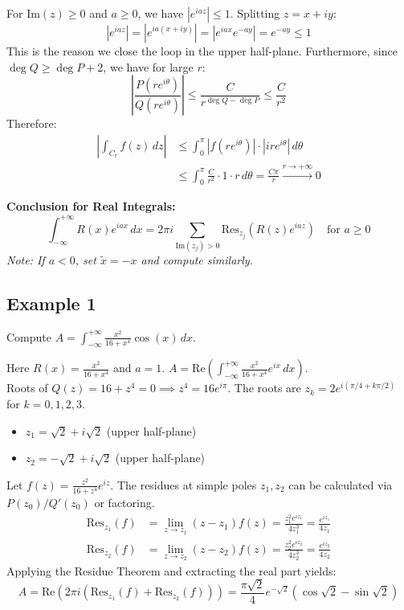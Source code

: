 \begin{proofbox}
For $\text{Im}(z) \ge 0$ and $a \ge 0$, we have $|e^{iaz}| \le 1$. Splitting $z = x + iy$:
\begin{equation*}
|e^{iaz}| = |e^{ia(x+iy)}| = |e^{iax} e^{-ay}| = e^{-ay} \le 1
\end{equation*}
This is the reason we close the loop in the upper half-plane. Furthermore, since $\deg Q \ge \deg P + 2$, we have for large $r$:
\begin{equation*}
\left| \frac{P(re^{i\theta})}{Q(re^{i\theta})} \right| \le \frac{C}{r^{\deg Q - \deg P}} \le \frac{C}{r^2}
\end{equation*}
Therefore:
\begin{align*}
\left| \int_{C_r} f(z) \, dz \right| &\le \int_0^\pi \left| f(re^{i\theta}) \right| \cdot \left| i r e^{i\theta} \right| \, d\theta \\
&\le \int_0^\pi \frac{C}{r^2} \cdot 1 \cdot r \, d\theta = \frac{C\pi}{r} \xrightarrow{r \to +\infty} 0
\end{align*}
\end{proofbox}

\noindent \textbf{Conclusion for Real Integrals:}
\begin{equation}
\int_{-\infty}^{+\infty} R(x)e^{iax} \, dx = 2\pi i \sum_{\text{Im}(z_j)>0} \text{Res}_{z_j} \left( R(z)e^{iaz} \right) \quad \text{for } a \ge 0
\end{equation}
\textit{Note: If $a < 0$, set $\tilde{x} = -x$ and compute similarly.}

\subsection{Example 1}
Compute $A = \int_{-\infty}^{+\infty} \frac{x^2}{16+x^4} \cos(x) \, dx$.

Here $R(x) = \frac{x^2}{16+x^4}$ and $a = 1$. $A = \text{Re} \left( \int_{-\infty}^{+\infty} \frac{x^2}{16+x^4} e^{ix} \, dx \right)$. \\
Roots of $Q(z) = 16+z^4 = 0 \implies z^4 = 16e^{i\pi}$. The roots are $z_k = 2e^{i(\pi/4 + k\pi/2)}$ for $k=0, 1, 2, 3$.
\begin{itemize}
    \item $z_1 = \sqrt{2} + i\sqrt{2}$ (upper half-plane)
    \item $z_2 = -\sqrt{2} + i\sqrt{2}$ (upper half-plane)
\end{itemize}
Let $f(z) = \frac{z^2}{16+z^4} e^{iz}$. The residues at simple poles $z_1, z_2$ can be calculated via $P(z_0)/Q'(z_0)$ or factoring.
\begin{align*}
\text{Res}_{z_1}(f) &= \lim_{z \to z_1} (z-z_1) f(z) = \frac{z_1^2 e^{iz_1}}{4z_1^3} = \frac{e^{iz_1}}{4z_1} \\
\text{Res}_{z_2}(f) &= \lim_{z \to z_2} (z-z_2) f(z) = \frac{z_2^2 e^{iz_2}}{4z_2^3} = \frac{e^{iz_2}}{4z_2}
\end{align*}
Applying the Residue Theorem and extracting the real part yields:
\begin{equation}
A = \text{Re} \left( 2\pi i (\text{Res}_{z_1}(f) + \text{Res}_{z_2}(f)) \right) = \frac{\pi\sqrt{2}}{4} e^{-\sqrt{2}} (\cos\sqrt{2} - \sin\sqrt{2})
\end{equation}

